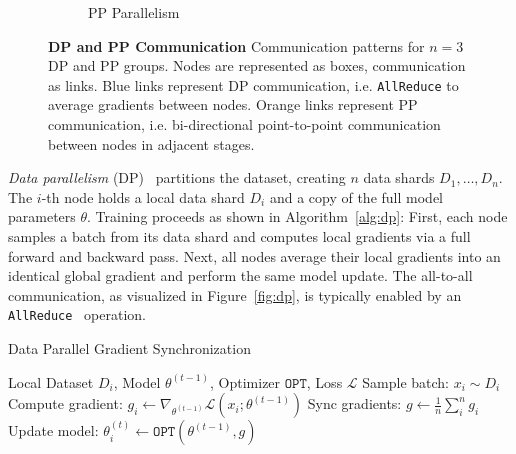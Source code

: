 \documentclass{article}
\begin{document}
\begin{figure}[ht]
\begin{subfigure}[b]{0.22\textwidth}
        \caption{PP Parallelism}
        \label{fig:pp}
    \end{subfigure}
    \caption{\textbf{DP and PP Communication} Communication patterns for $n=3$
    DP and PP groups. Nodes are represented as boxes, communication as links.
    {\color{bblue} Blue links} represent DP communication, i.e.
    \texttt{AllReduce} to average gradients between nodes.
    {\color{oorange}Orange links} represent PP communication, i.e.
    bi-directional point-to-point communication between nodes in adjacent
    stages.}
\end{figure}

\textit{Data parallelism} (DP)~\cite{dean2012dp} partitions the dataset,
creating $n$ data shards $D_1,\dots,D_n$. The $i$-th node holds a local data
shard $D_i$ and a copy of the full model parameters $\theta$. Training proceeds
as shown in Algorithm~\ref{alg:dp}: First, each node samples a batch from its
data shard and computes local gradients via a full forward and backward pass.
Next, all nodes average their local gradients into an identical global gradient
and perform the same model update. The all-to-all communication, as visualized
in Figure~\ref{fig:dp}, is typically enabled by an
\texttt{AllReduce}~\cite{walker1995mpi} operation.


\begin{algorithm}
\caption{Data Parallel Gradient Synchronization}
\label{alg:dp}
\begin{algorithmic}
 Local Dataset $D_i$, Model $\theta^{(t-1)}$, Optimizer $\mathtt{OPT}$, Loss $\mathcal{L}$
\STATE Sample batch: $x_i\sim D_i$
\STATE Compute gradient: $g_i \gets \nabla_{\theta^{(t-1)}} \mathcal{L}(x_i; \theta^{(t-1)})$
\STATE Sync gradients: $g \gets \frac{1}{n}\sum_{i}^n g_i$ 
\STATE Update model: $\theta_i^{(t)} \gets \mathtt{OPT}(\theta^{(t-1)}, g)$
\end{algorithmic}
\end{algorithm}
\end{document}
